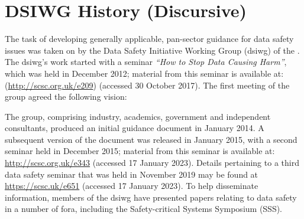 %
%
\section{DSIWG History (Discursive)} \label{bkm:history}


The task of developing generally applicable, pan-sector guidance for data safety issues was taken on by the Data Safety Initiative Working Group (\gls{dsiwg}) of the . The \gls{dsiwg}'s work started with a seminar \textit{``How to Stop Data Causing Harm''}, which was held in December 2012; material from this seminar is available at: (\href{http://scsc.org.uk/e209}{http://scsc.org.uk/e209}) (accessed 30 October 2017). The first meeting of the group agreed the following vision: 

\begin{quote}
\end{quote}

The group, comprising industry, academics, government and independent consultants,
produced an initial guidance document in January 2014.
A subsequent version of the document was released in January 2015,
with a second seminar  held in December 2015;
material from this seminar is available at: \href{http://scsc.org.uk/e343}{http://scsc.org.uk/e343} (accessed 17 January 2023).
Details pertaining to a third data safety seminar  that was held in November 2019 may be found at
\href{https://scsc.uk/e651}{https://scsc.uk/e651}
(accessed 17 January 2023).
To help disseminate information, members of the \gls{dsiwg} have presented papers relating to data safety in a number of fora,
including the Safety-critical Systems Symposium (SSS).

